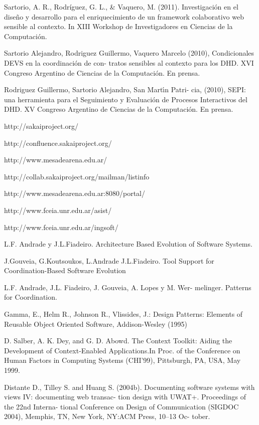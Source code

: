 \begin{thebibliography}{1}
{
Sartorio, A. R., Rodríguez, G. L., & Vaquero, M. (2011). Investigación en el diseño y desarrollo para el enriquecimiento de un framework colaborativo web sensible al contexto. In XIII Workshop de Investigadores en Ciencias de la Computación.



Sartorio Alejandro, Rodriguez Guillermo, Vaquero Marcelo
(2010), Condicionales DEVS en la coordinación de con-
tratos sensibles al contexto para los DHD. XVI Congreso
Argentino de Ciencias de la Computación. En prensa.

Rodriguez Guillermo, Sartorio Alejandro, San Martı́n Patri-
cia, (2010), SEPI: una herramienta para el Seguimiento y
Evaluación de Procesos Interactivos del DHD. XV Congreso
Argentino de Ciencias de la Computación. En prensa.

http://sakaiproject.org/

http://confluence.sakaiproject.org/

http://www.mesadearena.edu.ar/

http://collab.sakaiproject.org/mailman/listinfo

http://www.mesadearena.edu.ar:8080/portal/

http://www.fceia.unr.edu.ar/asist/

http://www.fceia.unr.edu.ar/ingsoft/

L.F. Andrade y J.L.Fiadeiro. Architecture Based Evolution
of Software Systems.

J.Gouveia, G.Koutsoukos, L.Andrade J.L.Fiadeiro. Tool
Support for Coordination-Based Software Evolution

L.F. Andrade, J.L. Fiadeiro, J. Gouveia, A. Lopes y M. Wer-
melinger. Patterns for Coordination.

Gamma, E., Helm R., Johnson R., Vlissides, J.: Design
Patterns: Elements of Reusable Object Oriented Software,
Addison-Wesley (1995)

D. Salber, A. K. Dey, and G. D. Abowd. The Context Toolkit:
Aiding the Development of Context-Enabled Applications.In
Proc. of the Conference on Human Factors in Computing
Systems (CHI’99), Pittsburgh, PA, USA, May 1999.

Distante D., Tilley S. and Huang S. (2004b). Documenting
software systems with views IV: documenting web transac-
tion design with UWAT+. Proceedings of the 22nd Interna-
tional Conference on Design of Communication (SIGDOC
2004), Memphis, TN, New York, NY:ACM Press, 10–13 Oc-
tober.

}
\end{thebibliography}
